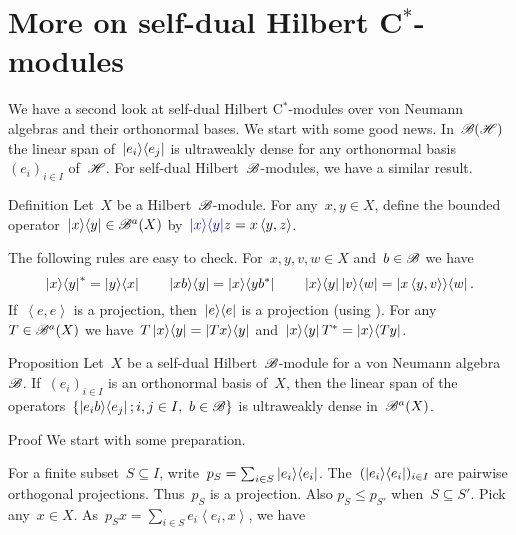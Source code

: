 \section{More on self-dual Hilbert C$^*$-modules}
\begin{parsec}%
\begin{point}%
We have a second look at
    self-dual Hilbert C$^*$-modules over von Neumann algebras
    and their orthonormal bases.
We start with some good news.
In~$\mathscr{B}(\mathscr{H})$ the linear span of~$\left|e_i\right>\!\left<e_j\right|$
    is ultraweakly dense for any orthonormal basis~$(e_i)_{i \in I}$
    of~$\mathscr{H}$.
For self-dual Hilbert~$\mathscr{B}$-modules, we have a similar result.
\end{point}
\begin{point}{Definition}%
Let~$X$ be a Hilbert~$\mathscr{B}$-module.
For any~$x, y \in X$,
define the bounded operator~$\left|x\right>\!\left<y\right| \in \mathscr{B}^a(X)$
by~$\Define{\ketbra{x}{y}}\index{*ketbra@$\ketbra{x}{y}$ for Hilbert $\scrB$-modules} z = x \left<y,z\right>$.
\begin{point}%
The following rules are easy to check.
For~$x,y,v,w \in X$ and~$b \in \mathscr{B}$
    we have
\begin{equation*}
\left|x\right>\!\left<y\right|^* = \left|y\right>\!\left<x\right| \qquad
\left|xb\right>\!\left<y\right| = \left|x\right>\!\left<yb^*\right| \qquad
\left|x\right>\!\left<y\right| \left|v\right>\!\left<w\right| = \left|x\left<y,v\right>\right>\!\left<w\right|.
\end{equation*}
If~$\left<e,e\right>$ is a projection,
    then~$\left|e\right>\!\left<e\right|$ is a projection
    (using ).
For any~$T \in \mathscr{B}^a(X)$
    we have~$T \left|x\right>\!\left<y\right| = \left|Tx\right>\!\left<y\right|$
    and~$\left|x\right>\!\left<y\right|T^* = \left|x\right>\!\left<Ty\right|$.
\end{point}
\end{point}
\begin{point}{Proposition}%
Let~$X$ be a self-dual Hilbert~$\mathscr{B}$-module
    for a von Neumann algebra~$\mathscr{B}$.
If~$(e_i)_{i \in I}$ is an orthonormal basis of~$X$,
then the linear span of
    the operators~$\{ \left|e_i b\right>\!\left<e_j\right|; i,j \in I, \ b \in \mathscr{B}\}$
    is ultraweakly dense in~$\mathscr{B}^a(X)$.
\begin{point}{Proof}%
We start with some preparation.
\begin{point}%
For a finite subset~$S \subseteq I$,
    write~$p_S = \sum_{i \in S} \left|e_i\right>\!\left<e_i\right|$.
The~$(\left|e_i\right>\!\left<e_i\right|)_{i \in I}$ are pairwise orthogonal projections.
Thus~$p_S$ is a projection.
Also $p_S \leq p_{S'}$ when~$S \subseteq S'$.
Pick any~$x \in X$.
As~$p_S x = \sum_{i \in S} e_i \left<e_i, x\right>$, we have

\end{point}
\end{point}
\end{point}
\end{parsec}

